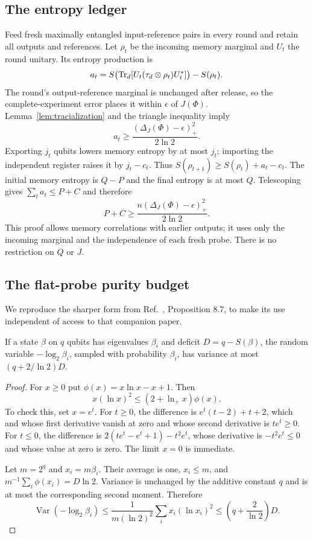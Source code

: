 \subsection{The entropy ledger}
Feed fresh maximally entangled input-reference pairs in every round and retain all
outputs and references. Let $\rho_t$ be the incoming memory marginal and $U_t$ the
round unitary. Its entropy production is
\[
 a_t=S\bigl(\operatorname{Tr}_d[U_t(\tau_d\otimes\rho_t)U_t^*]\bigr)-S(\rho_t).
\]
The round's output-reference marginal is unchanged after release, so the complete-experiment
error places it within $\epsilon$ of $J(\Phi)$. Lemma~\ref{lem:tracialization} and the
triangle inequality imply
\[
 a_t\ge\frac{(\Delta_J(\Phi)-\epsilon)_+^2}{2\ln2}.
\]
Exporting $j_t$ qubits lowers memory entropy by at most $j_t$; importing the independent
register raises it by $j_t-c_t$. Thus
$S(\rho_{t+1})\ge S(\rho_t)+a_t-c_t$. The initial memory entropy is $Q-P$ and the final
entropy is at most $Q$. Telescoping gives $\sum_ta_t\le P+C$ and therefore
\begin{equation}
 P+C\ge\frac{n(\Delta_J(\Phi)-\epsilon)_+^2}{2\ln2}.
 \label{eq:purity-full}
\end{equation}
This proof allows memory correlations with earlier outputs; it uses only the incoming
marginal and the independence of each fresh probe. There is no restriction on $Q$ or $J$.

\subsection{The flat-probe purity budget}
We reproduce the sharper form from Ref.~\cite{configuration}, Proposition 8.7, to make its
use independent of access to that companion paper.

\begin{lemma}\label{lem:variance}
If a state $\beta$ on $q$ qubits has eigenvalues $\beta_i$ and deficit
$D=q-S(\beta)$, the random variable $-\log_2\beta_i$, sampled with probability $\beta_i$,
has variance at most $(q+2/\ln2)D$.
\end{lemma}
\begin{proof}
For $x\ge0$ put $\phi(x)=x\ln x-x+1$. Then
\[
 x(\ln x)^2\le(2+\ln_+x)\phi(x).
\]
To check this, set $x=e^t$. For $t\ge0$, the difference is
$e^t(t-2)+t+2$, which and whose first derivative vanish at zero and whose second derivative
is $te^t\ge0$. For $t\le0$, the difference is
$2(te^t-e^t+1)-t^2e^t$, whose derivative is $-t^2e^t\le0$ and whose value at zero is
zero. The limit $x=0$ is immediate.

Let $m=2^q$ and $x_i=m\beta_i$. Their average is one, $x_i\le m$, and
$m^{-1}\sum_i\phi(x_i)=D\ln2$. Variance is unchanged by the additive constant $q$ and
is at most the corresponding second moment. Therefore
\[
 \operatorname{Var}(-\log_2\beta_i)
 \le\frac1{m(\ln2)^2}\sum_i x_i(\ln x_i)^2
 \le\left(q+\frac2{\ln2}\right)D.
\]
\end{proof}

